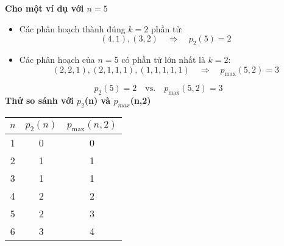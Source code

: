 \documentclass{article}
\begin{document}
	\textbf{Cho một ví dụ với $n=5$}
	
	\begin{itemize}
		\item Các phân hoạch thành đúng $k=2$ phần tử:
		\[
		(4,1), (3,2)
		\quad\Rightarrow\quad p_2(5) = 2
		\]
		\item Các phân hoạch của $n=5$ có phần tử lớn nhất là $k=2$:
		\[
		(2,2,1), (2,1,1,1), (1,1,1,1,1)
		\quad\Rightarrow\quad p_{\max}(5,2) = 3
		\]
	\end{itemize}
	
	\[
	p_2(5) = 2 \quad\text{vs.}\quad p_{\max}(5,2) = 3
	\]
	\newpage
	\textbf{Thử so sánh với $p_2$(n) và $p_{max}$(n,2)}
	\begin{center}
		\begin{tabular}{@{}ccc@{}}
			\toprule
			$n$ & $p_2(n)$ & $p_{\max}(n,2)$ \\
			\midrule
			1 & 0 & 0 \\
			2 & 1 & 1 \\
			3 & 1 & 1 \\
			4 & 2 & 2 \\
			5 & 2 & 3 \\
			6 & 3 & 4 \\
			\bottomrule
		\end{tabular}
	\end{center}
\end{document}
